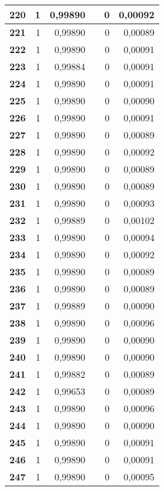 \begin{longtable}{|r|r|r|l|r|r|}
\textbf{220} & 1 & 0,99890 &  & 0 & 0,00092 \\ \hline
\textbf{221} & 1 & 0,99890 &  & 0 & 0,00089 \\ \hline
\textbf{222} & 1 & 0,99890 &  & 0 & 0,00091 \\ \hline
\textbf{223} & 1 & 0,99884 &  & 0 & 0,00091 \\ \hline
\textbf{224} & 1 & 0,99890 &  & 0 & 0,00091 \\ \hline
\textbf{225} & 1 & 0,99890 &  & 0 & 0,00090 \\ \hline
\textbf{226} & 1 & 0,99890 &  & 0 & 0,00091 \\ \hline
\textbf{227} & 1 & 0,99890 &  & 0 & 0,00089 \\ \hline
\textbf{228} & 1 & 0,99890 &  & 0 & 0,00092 \\ \hline
\textbf{229} & 1 & 0,99890 &  & 0 & 0,00089 \\ \hline
\textbf{230} & 1 & 0,99890 &  & 0 & 0,00089 \\ \hline
\textbf{231} & 1 & 0,99890 &  & 0 & 0,00093 \\ \hline
\textbf{232} & 1 & 0,99889 &  & 0 & 0,00102 \\ \hline
\textbf{233} & 1 & 0,99890 &  & 0 & 0,00094 \\ \hline
\textbf{234} & 1 & 0,99890 &  & 0 & 0,00092 \\ \hline
\textbf{235} & 1 & 0,99890 &  & 0 & 0,00089 \\ \hline
\textbf{236} & 1 & 0,99890 &  & 0 & 0,00089 \\ \hline
\textbf{237} & 1 & 0,99889 &  & 0 & 0,00090 \\ \hline
\textbf{238} & 1 & 0,99890 &  & 0 & 0,00096 \\ \hline
\textbf{239} & 1 & 0,99890 &  & 0 & 0,00090 \\ \hline
\textbf{240} & 1 & 0,99890 &  & 0 & 0,00090 \\ \hline
\textbf{241} & 1 & 0,99882 &  & 0 & 0,00089 \\ \hline
\textbf{242} & 1 & 0,99653 &  & 0 & 0,00089 \\ \hline
\textbf{243} & 1 & 0,99890 &  & 0 & 0,00096 \\ \hline
\textbf{244} & 1 & 0,99890 &  & 0 & 0,00090 \\ \hline
\textbf{245} & 1 & 0,99890 &  & 0 & 0,00091 \\ \hline
\textbf{246} & 1 & 0,99890 &  & 0 & 0,00091 \\ \hline
\textbf{247} & 1 & 0,99890 &  & 0 & 0,00095 \\ \hline

\end{longtable}
